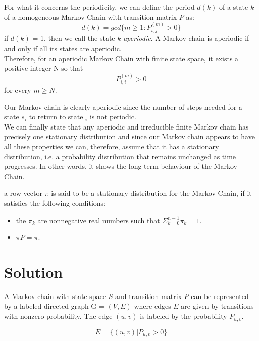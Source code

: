 \documentclass[10pt]{article}
\theoremstyle{plain}
\theoremstyle{definition}
\begin{document}
For what it concerns the periodicity, we can define the period $d(k)$ of a state $k$ of a homogeneous Markov Chain with transition matrix $P$ as:
\begin{equation}
    d(k) = gcd\{m \geq 1 : P_{i,j}^{(m)} > 0\}
\end{equation}
if $d(k)$ = 1, then we call the state $k$ \textit{aperiodic}.
A Markov chain is aperiodic if and only if all its states are aperiodic.\\
Therefore, for an aperiodic Markov Chain with finite state space, it exists a positive integer N so that  
\begin{equation}
    P_{i,i}^{(m)} > 0
\end{equation}
for every $m\geq N$.

Our Markov chain is clearly aperiodic since the number of steps needed for a state \textit{$s_i$}  to return to state $_i$ is not periodic. 
\\

We can finally state that any aperiodic and irreducible finite Markov chain has precisely one stationary distribution and since our Markov chain appears to have all these properties we can, therefore, assume that it has a stationary distribution, i.e. a probability distribution that remains unchanged as time progresses. In other words, it shows the long term behaviour of the Markov Chain. 

a row vector $\pi$ is said to be a stationary distribution for the Markov Chain, if it satisfies the following conditions:

\begin{itemize}
    \item the $\pi_k$ are nonnegative real numbers such that $\Sigma_{k=0}^{n-1}\pi_k = 1$.
    \item $\pi \textit{P} = \pi$.
\end{itemize}


\newpage
\section{Solution }
A Markov chain with state space $S$ and transition matrix $P$ can be represented by a labeled directed graph G = $(V,E)$ where edges $E$ are given by transitions with nonzero probability. The edge $(u,v)$ is labeled by the probability $P_{u,v}$.

\begin{equation}
    E = \{(u,v)| P_{u,v}>0\}
\end{equation}
\end{document}
